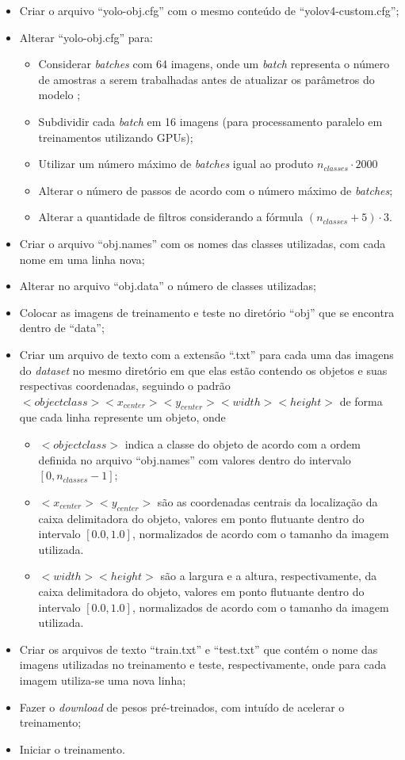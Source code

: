 \begin{itemize}
  \item Criar o arquivo ``yolo-obj.cfg'' com o mesmo conteúdo de ``yolov4-custom.cfg'';
  \item Alterar ``yolo-obj.cfg'' para:
  \begin{itemize}
    \item Considerar \textit{batches} com 64 imagens, onde um \textit{batch} representa o número de amostras a serem trabalhadas antes de atualizar os parâmetros do modelo \cite{ref:Brownlee};
    \item Subdividir cada \textit{batch} em 16 imagens (para processamento paralelo em treinamentos utilizando GPUs);
    \item Utilizar um número máximo de \textit{batches} igual ao produto $n_{classes} \cdot 2000$
    \item Alterar o número de passos de acordo com o número máximo de \textit{batches};
    \item Alterar a quantidade de filtros considerando a fórmula $(n_{classes} + 5) \cdot 3$.
  \end{itemize}
  \item Criar o arquivo ``obj.names'' com os nomes das classes utilizadas, com cada nome em uma linha nova;
  \item Alterar no arquivo ``obj.data'' o número de classes utilizadas;
  \item Colocar as imagens de treinamento e teste no diretório ``obj'' que se encontra dentro de ``data'';
  \item Criar um arquivo de texto com a extensão ``.txt'' para cada uma das imagens do \textit{dataset} no mesmo diretório em que elas estão contendo os objetos e suas respectivas coordenadas, seguindo o padrão  $<objectclass> <x_{center}> <y_{center}> <width> <height>$ de forma que cada linha represente um objeto, onde
  \begin{itemize}
    \item $<objectclass>$ indica a classe do objeto de acordo com a ordem definida no arquivo ``obj.names'' com valores dentro do intervalo $[0, n_{classes} - 1]$;
    \item $<x_{center}> <y_{center}>$ são as coordenadas centrais da localização da caixa delimitadora do objeto, valores em ponto flutuante dentro do intervalo $[0.0, 1.0]$, normalizados de acordo com o tamanho da imagem utilizada.
    \item $<width> <height>$ são a largura e a altura, respectivamente, da caixa delimitadora do objeto, valores em ponto flutuante dentro do intervalo $[0.0, 1.0]$, normalizados de acordo com o tamanho da imagem utilizada.
  \end{itemize}
  \item Criar os arquivos de texto ``train.txt'' e ``test.txt'' que contém o nome das imagens utilizadas no treinamento e teste, respectivamente, onde para cada imagem utiliza-se uma nova linha;
  \item Fazer o \textit{download} de pesos pré-treinados, com intuído de acelerar o treinamento;
  \item Iniciar o treinamento.
\end{itemize}

